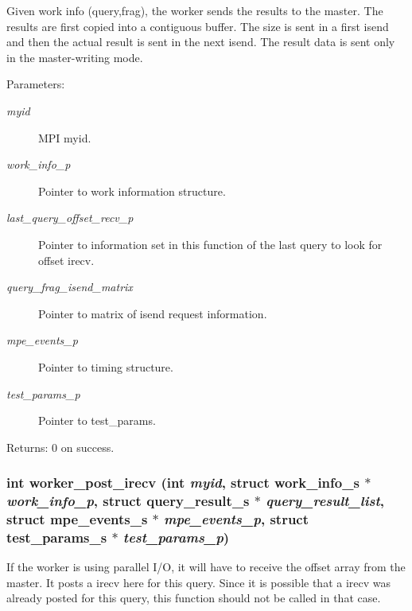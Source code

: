 Given work info (query,frag), the worker sends the results to the master. The results are first copied into a contiguous buffer. The size is sent in a first isend and then the actual result is sent in the next isend. The result data is sent only in the master-writing mode.

\begin{Desc}
\item[Parameters:]
\begin{description}
\item[{\em myid}]MPI myid. \item[{\em work\_\-info\_\-p}]Pointer to work information structure. \item[{\em last\_\-query\_\-offset\_\-recv\_\-p}]Pointer to information set in this function of the last query to look for offset irecv. \item[{\em query\_\-frag\_\-isend\_\-matrix}]Pointer to matrix of isend request information. \item[{\em mpe\_\-events\_\-p}]Pointer to timing structure. \item[{\em test\_\-params\_\-p}]Pointer to test\_\-params. \end{description}
\end{Desc}
\begin{Desc}
\item[Returns:]0 on success. \end{Desc}
\subsubsection{\setlength{\rightskip}{0pt plus 5cm}int worker\_\-post\_\-irecv (int {\em myid}, struct \bf{work\_\-info\_\-s} $\ast$ {\em work\_\-info\_\-p}, struct \bf{query\_\-result\_\-s} $\ast$ {\em query\_\-result\_\-list}, struct \bf{mpe\_\-events\_\-s} $\ast$ {\em mpe\_\-events\_\-p}, struct \bf{test\_\-params\_\-s} $\ast$ {\em test\_\-params\_\-p})}\label{worker__help_8h_b07ca743d3a52f123f00baad6be7bb8e}


If the worker is using parallel I/O, it will have to receive the offset array from the master. It posts a irecv here for this query. Since it is possible that a irecv was already posted for this query, this function should not be called in that case.

